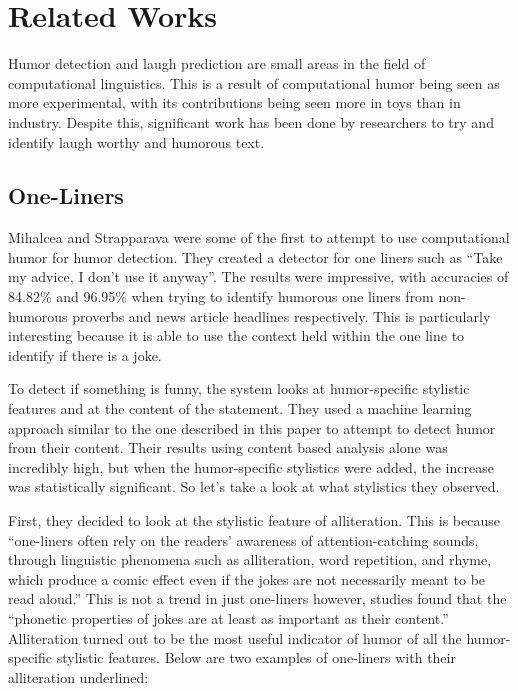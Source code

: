 \chapter{Related Works}

Humor detection and laugh prediction are small areas in the field of computational linguistics. This is a result of computational humor being seen as more experimental, with its contributions being seen more in toys than in industry. Despite this, significant work has been done by researchers to try and identify laugh worthy and humorous text.

\section{One-Liners}
Mihalcea and Strapparava were some of the first to attempt to use computational humor for humor detection. They created a detector for one liners such as ``Take my advice, I don't use it anyway''.\cite{oneliners} The results were impressive, with accuracies of 84.82\% and 96.95\% when trying to identify humorous one liners from non-humorous proverbs and news article headlines respectively. This is particularly interesting because it is able to use the context held within the one line to identify if there is a joke. \cite{oneliners}

To detect if something is funny, the system looks at humor-specific stylistic features and at the content of the statement. \cite{oneliners} They used a machine learning approach similar to the one described in this paper to attempt to detect humor from their content. Their results using content based analysis alone was incredibly high, but when the humor-specific stylistics were added, the increase was statistically significant. So let's take a look at what stylistics they observed.

First, they decided to look at the stylistic feature of alliteration. This is because ``one-liners often rely on the readers' awareness of attention-catching sounds, through linguistic phenomena such as alliteration, word repetition, and rhyme, which produce a comic effect even if the jokes are not necessarily meant to be read aloud.'' \cite{oneliners} This is not a trend in just one-liners however, studies found that the ``phonetic properties of jokes are at least as important as their content.'' \cite{oneliners} Alliteration turned out to be the most useful indicator of humor of all the humor-specific stylistic features. Below are two examples of one-liners with their alliteration underlined:\newline

